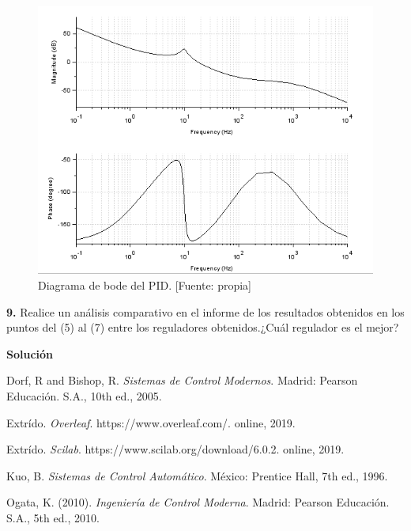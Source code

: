 \documentclass[12pt,letterpaper]{article}
\begin{document}
\begin{figure}[hbtp]
	\centering
	\includegraphics[width = .75 \columnwidth]{bodePID.png} 
	\caption[Figura7]{Diagrama de bode del PID. [Fuente: propia]} 
	\label{fig:fig10} 
\end{figure}

\bigskip

\bigskip


\textbf{9.} Realice un análisis comparativo en el informe de los resultados obtenidos en los puntos del (5) al (7) entre los reguladores obtenidos.¿Cuál regulador es el mejor?\\

 

\bigskip

\textbf{Solución}

\bigskip

\begin{thebibliography}{1}
Dorf, R and Bishop, R. \emph{Sistemas de Control Modernos}. Madrid: Pearson Educación. S.A., 10th ed., 2005.

Extrído. \emph{Overleaf}. https://www.overleaf.com/. online, 2019.

Extrído. \emph{Scilab}. https://www.scilab.org/download/6.0.2. online, 2019.

Kuo, B. \emph{Sistemas de Control Automático}. México: Prentice Hall, 7th ed., 1996.

Ogata, K. (2010). \emph{Ingeniería de Control Moderna}. Madrid: Pearson Educación. S.A., 5th ed., 2010.

\end{thebibliography}


\nocite{*}


\end{document}
